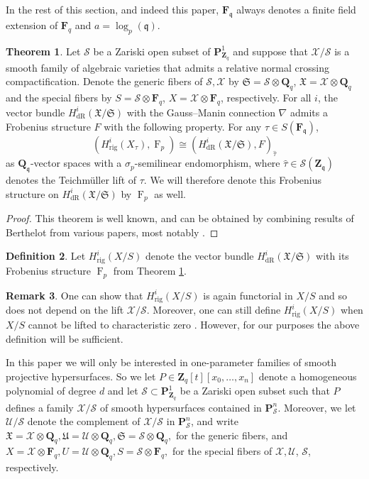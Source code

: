 \documentclass[a4paper,11pt]{article}
\numberwithin{equation}{section}
\newcommand{\ZZ}{\mathbf{Z}} %
\newcommand{\QQ}{\mathbf{Q}} %
\newcommand{\FF}{\mathbf{F}} %
\DeclareMathOperator{\Frob}{F}           %
\providecommand{\HdR}{H_{\text{dR}}}    %
\providecommand{\Hrig}{H_{\text{rig}}}  %
\theoremstyle{definition}
\newtheorem{thm}{Theorem}[section]
\newtheorem{defn}[thm]{Definition}
\newtheorem{rem}[thm]{Remark}
\begin{document}
In the rest of this section, and indeed this paper, $\FF_{\mathfrak{q}}$ always
denotes a finite field extension of $\FF_q$ and $a=\log_p(\mathfrak{q})$.

\begin{thm} \label{thm:frobstruc}
Let $\mathcal{S}$ be a Zariski open subset of $\mathbf{P}^1_{\ZZ_q}$ and suppose that 
$\mathcal{X}/\mathcal{S}$ is a smooth family of algebraic varieties that admits a relative
normal crossing compactification. Denote the generic fibers of $\mathcal{S},\mathcal{X}$ by
$\mathfrak{S}=\mathcal{S} \otimes \QQ_q$, $\mathfrak{X}=\mathcal{X} \otimes \QQ_q$
and the special fibers by $S=\mathcal{S} \otimes \FF_q$, $X=\mathcal{X} \otimes \FF_q$, respectively.
For all $i$, the vector bundle $\HdR^i(\mathfrak{X}/\mathfrak{S})$ with the
Gauss--Manin connection $\nabla$ admits a Frobenius structure $F$ with the following property.
For any $\tau \in S(\FF_{\mathfrak{q}})$,
\[
(\Hrig^i(X_{\tau}),\Frob_p) \cong (\HdR^i(\mathfrak{X}/\mathfrak{S}),F)_{\hat{\tau}}
\] 
as $\QQ_{\mathfrak{q}}$-vector spaces with a $\sigma_p$-semilinear endomorphism, where 
$\hat{\tau} \in \mathcal{S}(\ZZ_{\mathfrak{q}})$ denotes the Teichm\"uller lift of $\tau$. 
We will therefore denote this Frobenius structure on $\HdR^i(\mathfrak{X}/\mathfrak{S})$ by $\Frob_p$ 
as well.
\end{thm}

\begin{proof}
This theorem is well known, and can be obtained by combining results of 
Berthelot from various papers, most notably \cite{Berthelot1986}.   
\end{proof}

\begin{defn}
Let $\Hrig^i(X/S)$ denote the vector bundle $\HdR^i(\mathfrak{X}/\mathfrak{S})$ with its Frobenius
structure $\Frob_p$ from Theorem \ref{thm:frobstruc}.
\end{defn}

\begin{rem}
One can show that $\Hrig^i(X/S)$ is again functorial in $X/S$ and so does not depend on the lift $\mathcal{X}/\mathcal{S}$. 
Moreover, one can still define $\Hrig^i(X/S)$ when $X/S$ cannot be lifted to characteristic zero \cite{Berthelot1986}.
However, for our purposes the above definition will be sufficient.
\end{rem}

In this paper we will only be interested in one-parameter families of smooth projective hypersurfaces. 
So we let $P \in \ZZ_q[t][x_0,\ldots,x_n]$ denote a homogeneous polynomial of degree $d$ and let 
$\mathcal{S} \subset \mathbf{P}^1_{\ZZ_q}$ be a Zariski open subset such that $P$ defines a family  
$\mathcal{X}/\mathcal{S}$ of smooth hypersurfaces contained in $\mathbf{P}^n_{\mathcal{S}}$. Moreover, we let
$\mathcal{U}/\mathcal{S}$ denote the complement of $\mathcal{X}/\mathcal{S}$ in $\mathbf{P}^n_{\mathcal{S}}$,
and write 
$\mathfrak{X}=\mathcal{X} \otimes \QQ_q, \mathfrak{U}=\mathcal{U} \otimes \QQ_q, \mathfrak{S}=\mathcal{S} \otimes \QQ_q,$
for the generic fibers, and
$X=\mathcal{X} \otimes \FF_q, U=\mathcal{U} \otimes \QQ_q, S=\mathcal{S} \otimes \FF_q,$
for the special fibers of $\mathcal{X},\mathcal{U}$, $\mathcal{S}$, respectively.
\end{document}
